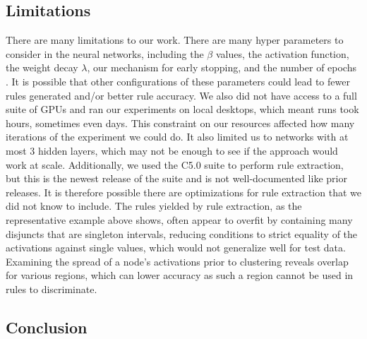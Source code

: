 \subsection{Limitations}
\label{sec:limitations}
There are many limitations to our work. There are many
hyper parameters to consider in the neural networks, including the
$\beta$ values, the activation function, the weight decay $\lambda$,
our mechanism for early stopping, and the number of epochs
. It is possible that other configurations of these
parameters could lead to fewer rules generated and/or better rule
accuracy. We also did not have access to a full suite of GPUs
and ran our experiments on local desktops, which meant runs took
hours, sometimes even days. This constraint on our resources affected
how many iterations of the experiment we could do. It also limited us to networks with at most 3 hidden layers, which may not be enough
to see if the approach would work at scale. Additionally, we
used the C5.0 suite to perform rule extraction, but this is the newest
release of the suite and is not well-documented like prior releases. It is
therefore possible there are optimizations for rule extraction that we
did not know to include. The rules yielded by rule extraction, as the representative example above shows, often appear to overfit by containing many disjuncts that are singleton intervals, reducing conditions to strict equality of the activations against single values, which would not generalize well for test data. Examining the spread of a node's activations prior to clustering reveals overlap for various regions, which can lower accuracy as such a region cannot be used in rules to discriminate.

\subsection{Conclusion}
\label{sec:conclusion}

